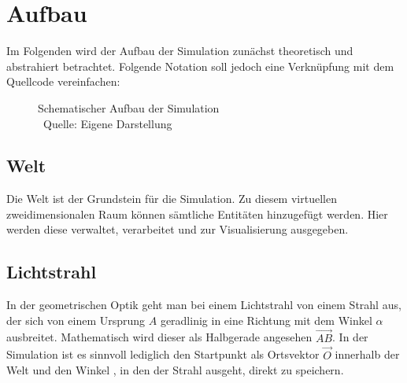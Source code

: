 \chapter{Aufbau}
Im Folgenden wird der Aufbau der Simulation zunächst theoretisch und abstrahiert betrachtet. 
Folgende Notation soll jedoch eine Verknüpfung mit dem Quellcode vereinfachen: 
\begin{figure}
    \centering
    \caption{Schematischer Aufbau der Simulation \\ Quelle: Eigene Darstellung}
    \label{m1}
\end{figure}

\section{Welt}
Die Welt  ist der Grundstein für die Simulation. 
Zu diesem virtuellen zweidimensionalen Raum können sämtliche Entitäten hinzugefügt werden. 
Hier werden diese verwaltet, verarbeitet und zur Visualisierung ausgegeben. 

\section{Lichtstrahl}
In der geometrischen Optik geht man bei einem Lichtstrahl  
von einem Strahl aus, der sich von einem Ursprung $ A $  
geradlinig in eine Richtung mit dem Winkel 
$ \alpha $ ausbreitet. \parencite[vgl.][S. 1041]{tipler2015physik} Mathematisch 
wird dieser als Halbgerade angesehen $ \overrightarrow{AB} $. 
In der Simulation ist es sinnvoll lediglich den Startpunkt als Ortsvektor $ \vec{O} $  innerhalb der Welt
und den Winkel , in den der Strahl ausgeht, direkt zu speichern. 

